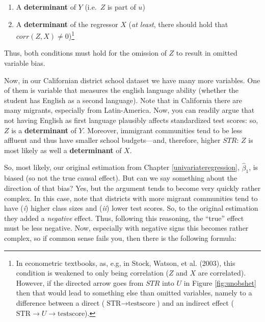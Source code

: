 \documentclass[
]{book}
\providecommand{\tightlist}{%
  \setlength{\itemsep}{0pt}\setlength{\parskip}{0pt}}
\begin{document}
\begin{enumerate}
\def\labelenumi{\arabic{enumi}.}
\tightlist
\item
  A \textbf{determinant} of \(Y\) (i.e.~\(Z\) is part of \(u\))
\item
  A \textbf{determinant} of the regressor \(X\) (\emph{at least}, there should hold that \(corr(Z,X) \neq 0\))\footnote{In econometric textbooks, as, e.g, in Stock, Watson, et al. (2003), this condition is weakened to only being correlation (\(Z\) and \(X\) are correlated). However, if the directed arrow goes from \(STR\) into \(U\) in Figure \ref{fig:unobshet} then that would lead to something else than omitted variables, namely to a difference between a direct (\(\text{STR} \longrightarrow \text{testscore}\)) and an indirect effect (\(\text{STR} \longrightarrow U \longrightarrow \text{testscore}\)).}
\end{enumerate}

Thus, both conditions must hold for the omission of \(Z\) to result in omitted variable bias.

Now, in our Californian district school dataset we have many more variables. One of them is variable that measures the english language ability (whether the student has English as a second language). Note that in California there are many migrants, especially from Latin-America. Now, you can readily argue that not having English as first language plausibly affects standardized test scores: so, \(Z\) is a \textbf{determinant} of \(Y\). Moreover, immigrant communities tend to be less affluent and thus have smaller school budgets---and, therefore, higher \(STR\): \(Z\) is most likely as well a \textbf{determinant} of \(X\).

So, most likely, our original estimation from Chapter \ref{univariateregression}, \(\hat{\beta}_1\), is biased (so not the true causal effect). But can we say something about the direction of that bias? Yes, but the argument tends to become very quickly rather complex. In this case, note that districts with more migrant communities tend to have (\emph{i}) higher class sizes and (\emph{ii}) lower test scores. So, to the original estimation they added a \emph{negative} effect. Thus, following this reasoning, the ``true'' effect must be less negative. Now, especially with negative signs this becomes rather complex, so if common sense fails you, then there is the following formula:
\end{document}
